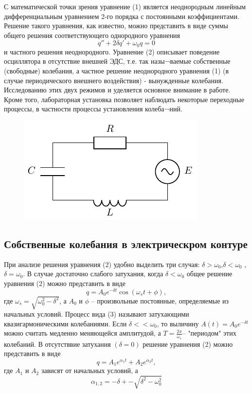  С математической точки зрения уравнение (1) является неоднородным линейным дифференциальным уравнением 2-го порядка с постоянными коэффициентами. Решение такого уравнения, как известно, можно представить в виде суммы общего решения соответствующего однородного уравнения
\begin{equation}
	q''+2\delta q'+\omega_0 q=0
\end{equation}
и частного решения неоднородного. Уравнение (2) описывает поведение осциллятора в отсутствие внешней ЭДС, т.е. так назы¬ваемые собственные (свободные) колебания, а частное решение неоднородного уравнения (1) (в случае периодического внешнего воздействия) - вынужденные колебания. Исследованию этих двух режимов и уделяется основное внимание в работе. Кроме того, лабораторная установка позволяет наблюдать некоторые переходные процессы, в частности процессы установления колеба¬ний.
\begin{figure}[h!]
	\centering
    \includegraphics[]{chem/rcle}
    \caption{}
    \label{chem:rcle}
\end{figure}

\subsection{Собственные колебания в электрическром контуре}
При анализе решения уравнения (2) удобно выделить три случая: $\delta > \omega_0$,$\delta < \omega_0$ ,$\delta = \omega_0$.
В случае достаточно слабого затухания, когда $\delta < \omega_0$ общее решение уравнения (2) можно представить в виде
\begin{equation}
	q=A_0 e^{-\delta t}\cos(\omega_s t+\phi),
\end{equation}
где $\omega_s=\sqrt{\omega_0^2-\delta^2}$, а $A_0$ и $\phi$ -- произвольные постоянные, определяемые из начальных условий.
Процесс вида (3) называют затухающими квазигармоническими колебаниями. Если $\delta<<\omega_0$, то выличину $A(t)=A_0e^{-\delta t}$ можно считать медленно меняющейся амплитудой, а 
$T=\frac{2\pi}{\omega_s}$-- "периодом" этих колебаний.
В отсутстввие затухания $(\delta=0)$ решение уравнения (2) можно представить в виде
\begin{equation}
	q=A_1e^{\alpha_1 t}+A_2e^{\alpha_2 t},
\end{equation}
где $A_1$ и $A_2$ зависят от начальных условий, а 
\begin{equation}
	\alpha_{1,2}=-\delta+-\sqrt{\delta^2-\omega_0^2}
\end{equation}

